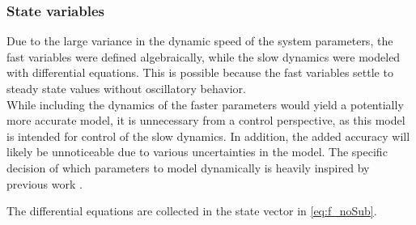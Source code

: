 \newpage

\subsubsection{State variables}

Due to the large variance in the dynamic speed of the system parameters, the fast variables were defined algebraically, while the slow dynamics were modeled with differential equations. This is possible because the fast variables settle to steady state values without oscillatory behavior. \\

While including the dynamics of the faster parameters would yield a potentially more accurate model, it is unnecessary from a control perspective, as this model is intended for control of the slow dynamics. In addition, the added accuracy will likely be unnoticeable due to various uncertainties in the model. The specific decision of which parameters to model dynamically is heavily inspired by previous work \cite{Sorensen2013}.

The differential equations are collected in the state vector in \cref{eq:f_noSub}.



